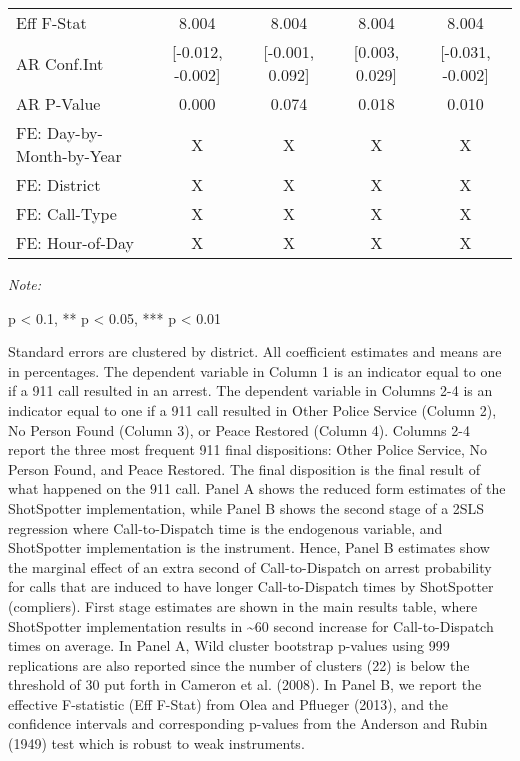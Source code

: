 \begin{table}[H]
\begin{threeparttable}
\begin{tabular}[t]{lcccc}
\hspace{1em}Eff F-Stat & 8.004 & 8.004 & 8.004 & 8.004\\
\hspace{1em}AR Conf.Int & {}[-0.012, -0.002] & {}[-0.001, 0.092] & {}[0.003, 0.029] & {}[-0.031, -0.002]\\
\hspace{1em}AR P-Value & 0.000 & 0.074 & 0.018 & 0.010\\
\midrule
FE: Day-by-Month-by-Year & X & X & X & X\\
FE: District & X & X & X & X\\
FE: Call-Type & X & X & X & X\\
FE: Hour-of-Day & X & X & X & X\\
\bottomrule
\end{tabular}
\begin{tablenotes}
\item \textit{Note: } 
\item * p < 0.1, ** p < 0.05, *** p < 0.01
\item Standard errors are clustered by district. All                      coefficient estimates and means are in percentages.                        The dependent variable in Column 1 is an indicator equal to one if a 911 call resulted in an arrest.                      The dependent variable in Columns 2-4 is an indicator equal to one if a 911 call resulted in                       Other Police Service (Column 2), No Person Found (Column 3), or Peace Restored (Column 4).                  Columns 2-4 report the three most frequent 911 final dispositions: Other Police Service, No Person Found,                   and Peace Restored. The final disposition is the final result of                  what happened on the 911 call.                   Panel A shows the reduced form estimates of the ShotSpotter implementation, while                       Panel B shows the second stage of a 2SLS regression where Call-to-Dispatch time is the                      endogenous variable, and ShotSpotter implementation is the instrument.                  Hence, Panel B estimates show the marginal effect of an extra second of Call-to-Dispatch on                  arrest probability for calls that are induced to have longer Call-to-Dispatch times by ShotSpotter (compliers).                  First stage estimates are shown in the main results table, where ShotSpotter implementation results in \textasciitilde{}60                  second increase for Call-to-Dispatch times on average.                  In Panel A, Wild cluster bootstrap p-values using 999 replications are also reported                  since the number of clusters (22) is below the threshold of 30 put forth in                  Cameron et al. (2008).                  In Panel B, we report the effective F-statistic (Eff F-Stat) from Olea and Pflueger (2013), and the confidence intervals and corresponding                  p-values from the Anderson and Rubin (1949) test which is robust to weak instruments.                  
\end{tablenotes}
\end{threeparttable}
\end{table}

